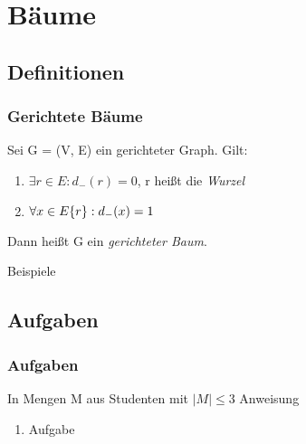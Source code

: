 \section{Bäume}
\subsection{Definitionen}
\begin{frame}
  \frametitle{Gerichtete Bäume}
  \begin{definition}
    Sei G = (V, E) ein gerichteter Graph. Gilt:
    \begin{enumerate}
      \item $\exists r \in E: d_-(r) = 0$, r heißt die \emph{Wurzel}
      \item $\forall x \in E\\\{r\}: d_-(x) = 1$
    \end{enumerate}
    Dann heißt G ein \emph{gerichteter Baum}.
  \end{definition}\pause
  \begin{exampleblock}{Beispiele}
    \begin{itemize}
    \end{itemize}
  \end{exampleblock}
\end{frame}

\subsection{Aufgaben}
\begin{frame}
  \frametitle{Aufgaben}
  \begin{exampleblock}{In Mengen M aus Studenten mit $|M| \leq 3$}
      Anweisung
      \begin{enumerate}
        \item Aufgabe
      \end{enumerate}
  \end{exampleblock}
\end{frame}

